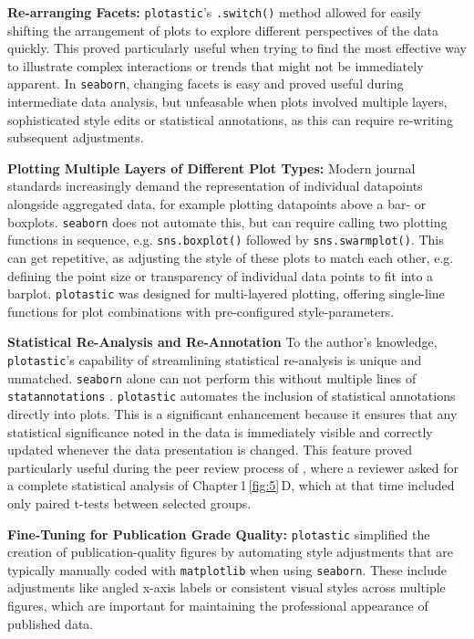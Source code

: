 \textbf{Re-arranging Facets:} \texttt{plotastic}'s \texttt{.switch()} method
allowed for easily shifting the arrangement of plots  to explore different perspectives of the data quickly. This proved
particularly useful when trying to find the most effective way to illustrate
complex interactions or trends that might not be immediately apparent. In
\texttt{seaborn}, changing facets is easy and proved useful during
intermediate data analysis, but unfeasable when plots involved multiple
layers, sophisticated style edits or statistical annotations, as this can
require re-writing subsequent adjustments.


\textbf{Plotting Multiple Layers of Different Plot Types:}
Modern journal standards increasingly demand the representation of individual
datapoints alongside aggregated data, for example plotting datapoints above a
bar- or boxplots. \texttt{seaborn} does not automate this, but can require
calling two plotting functions in sequence, e.g. \texttt{sns.boxplot()} followed
by \texttt{sns.swarmplot()}. This can get repetitive, as adjusting the
style of these plots to match each other, e.g. defining the point
size or transparency of individual data points to fit into a barplot.
\texttt{plotastic} was designed for multi-layered plotting, offering single-line
functions for plot combinations with pre-configured style-parameters.

\textbf{Statistical Re-Analysis and Re-Annotation}
To the author's knowledge, \texttt{plotastic}'s capability of streamlining
statistical re-analysis is unique and unmatched. \texttt{seaborn} alone can not
perform this without multiple lines of \texttt{statannotations}
\cite{charlierTrevismdStatannotationsV02022}. \texttt{plotastic} automates the
inclusion of statistical annotations directly into plots. This is a significant
enhancement because it ensures that any statistical significance noted in the
data is immediately visible and correctly updated whenever the data presentation
is changed. This feature proved particularly useful during the peer review
process of \citet{kuricModelingMyelomaDissemination2024}, where a reviewer asked
for a complete statistical analysis of Chapter\,1\,\ref{fig:5}\,D, which at that
time included only paired t-tests between selected groups.

\textbf{Fine-Tuning for Publication Grade Quality:}
\texttt{plotastic} simplified the creation of publication-quality figures by
automating style adjustments that are typically manually coded with
\texttt{matplotlib} when using \texttt{seaborn}. These include adjustments like
angled x-axis labels or consistent visual styles across multiple figures, which
are important for maintaining the professional appearance of published data.


